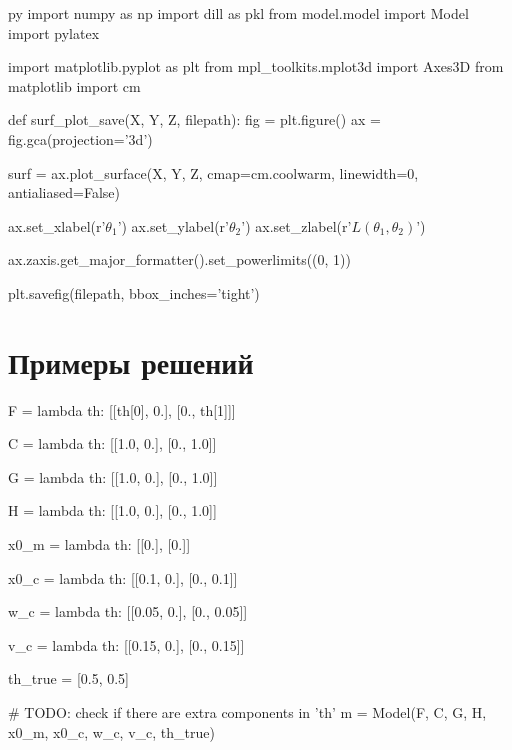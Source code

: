 \documentclass[a4paper,14pt]{extarticle}
\begin{document}
\begin{pythontexcustomcode}{py}
import numpy as np
import dill as pkl
from model.model import Model
import pylatex

import matplotlib.pyplot as plt
from mpl_toolkits.mplot3d import Axes3D
from matplotlib import cm

def surf_plot_save(X, Y, Z, filepath):
    fig = plt.figure()
    ax = fig.gca(projection='3d')

    surf = ax.plot_surface(X, Y, Z, cmap=cm.coolwarm,
                           linewidth=0, antialiased=False)

    ax.set_xlabel(r'$\theta_1$')
    ax.set_ylabel(r'$\theta_2$')
    ax.set_zlabel(r'$L(\theta_1, \theta_2)$')

    ax.zaxis.get_major_formatter().set_powerlimits((0, 1))

    plt.savefig(filepath, bbox_inches='tight')
\end{pythontexcustomcode}

\section{Примеры решений}

\begin{pycode}[model1]
F = lambda th: [[th[0], 0.],
                [0., th[1]]]

C = lambda th: [[1.0, 0.],
                [0., 1.0]]

G = lambda th: [[1.0, 0.],
                [0., 1.0]]

H = lambda th: [[1.0, 0.],
                [0., 1.0]]

x0_m = lambda th: [[0.],
                   [0.]]

x0_c = lambda th: [[0.1, 0.],
                   [0., 0.1]]

w_c = lambda th: [[0.05, 0.],
                  [0., 0.05]]

v_c = lambda th: [[0.15, 0.],
                  [0., 0.15]]

th_true = [0.5, 0.5]

# TODO: check if there are extra components in 'th'
m = Model(F, C, G, H, x0_m, x0_c, w_c, v_c, th_true)
\end{pycode}

\end{document}
